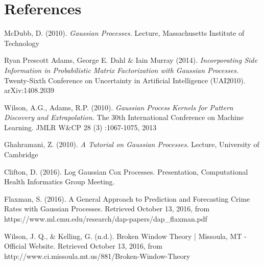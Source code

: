 \documentclass[letterpaper]{article}
\begin{document}
	\section{References}
	
	\smallskip \noindent McDubb, D. (2010).
	\textit{Gaussian Processes.}
	Lecture, Massachusetts Institute of Technology
	
	\smallskip \noindent Ryan Prescott Adams, George E. Dahl \& Iain Murray (2014).
	\textit{Incorporating Side Information in Probabilistic Matrix Factorization with Gaussian Processes.}
	Twenty-Sixth Conference on Uncertainty in Artificial Intelligence (UAI2010). arXiv:1408.2039

	\smallskip \noindent Wilson, A.G., Adams, R.P. (2010).
	\textit{Gaussian Process Kernels for Pattern Discovery and Extrapolation.}
	The 30th International Conference on Machine Learning. JMLR W\&CP 28 (3) :1067-1075, 2013
	
	\smallskip \noindent Ghahramani, Z. (2010).
	\textit{A Tutorial on Gaussian Processes.}
	Lecture, University of Cambridge
	
	\smallskip \noindent Clifton, D. (2016).
	Log Gaussian Cox Processes. Presentation, Computational Health Informatics Group Meeting.

	\smallskip \noindent Flaxman, S. (2016).
	A General Approach to Prediction and Forecasting Crime Rates with Gaussian Processes. Retrieved October 13, 2016, from https://www.ml.cmu.edu/research/dap-papers/dap\_flaxman.pdf

	\smallskip \noindent Wilson, J. Q., \& Kelling, G. (n.d.).
	Broken Window Theory | Missoula, MT - Official Website. Retrieved October 13, 2016, from http://www.ci.missoula.mt.us/881/Broken-Window-Theory
\end{document}
